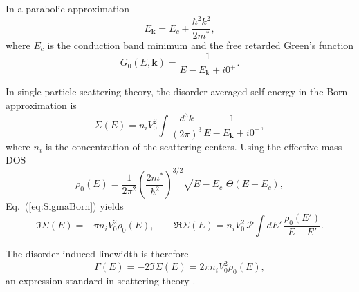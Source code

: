 
In a parabolic approximation
\begin{equation}
E_{\mathbf{k}} = E_c + \frac{\hbar^2 k^2}{2 m^\ast},
\end{equation}
where $E_c$ is the conduction band minimum and the free retarded Green's function \cite{Economou2006}
\begin{equation}
G_0(E,\mathbf{k}) = \frac{1}{E - E_{\mathbf{k}} + i 0^+}.
\end{equation}


In single-particle scattering theory, the disorder-averaged self-energy in the Born approximation \cite{Mahan2000,PhysRevB.89.054202} is
\begin{equation}
\Sigma(E) = n_i V_0^2 
\int \frac{d^3 k}{(2\pi)^3}
\frac{1}{E - E_{\mathbf{k}} + i 0^+},
\label{eq:SigmaBorn}
\end{equation}
where $n_i$ is the concentration of the scattering centers.
Using the effective-mass DOS \cite{Kittel2005}
\begin{equation}
\rho_0(E) = 
\frac{1}{2\pi^2}
\left(\frac{2 m^\ast}{\hbar^2}\right)^{3/2}
\sqrt{E - E_c}
\;\Theta(E - E_c),
\end{equation}
Eq.~(\ref{eq:SigmaBorn}) yields \cite{Mahan2000}
\begin{equation}
\Im \Sigma(E) = -\pi n_i V_0^2 \rho_0(E),
\qquad
\Re \Sigma(E) = n_i V_0^2 
\, \mathcal{P}
\int dE'\, \frac{\rho_0(E')}{E - E'}.
\end{equation}


The disorder-induced linewidth is therefore
\begin{equation}
\Gamma(E) = -2 \Im \Sigma(E)
           = 2\pi n_i V_0^2 \rho_0(E),
\end{equation}
an expression standard in scattering theory \cite{Mahan2000}.

